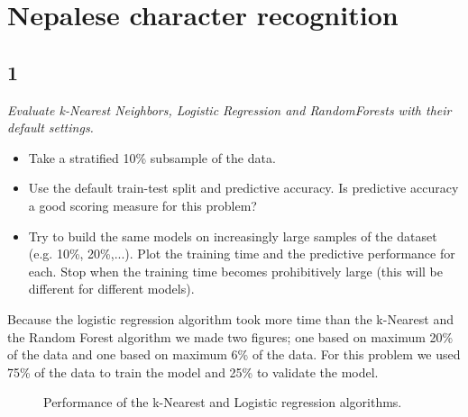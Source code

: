 \documentclass[a4paper,12pt]{article}
\begin{document}

\tableofcontents %

\section*{Nepalese character recognition}
\subsection*{1}
{\it Evaluate k-Nearest Neighbors, Logistic Regression and RandomForests with their default
settings.
\begin{itemize}
\item{Take a stratified 10\% subsample of the data.}
\item{Use the default train-test split and predictive accuracy. Is predictive accuracy a good scoring measure for this problem?}
\item{Try to build the same models on increasingly large samples of the dataset (e.g. 10\%,
20\%,...). Plot the training time and the predictive performance for each. Stop when the
training time becomes prohibitively large (this will be different for different models).}
\end{itemize}
\textnormal{Because the logistic regression algorithm took more time than the k-Nearest and the Random Forest algorithm we made two figures; one based on maximum 20\% of the data and one based on maximum 6\% of the data. For this problem we used 75\% of the data to train the model and 25\% to validate the model.}

\begin{figure}[H]
\hfill
{}
\hfill
\caption{Performance of the k-Nearest and Logistic regression algorithms. }
\label{Q21a}
\end{figure}

}
\end{document}
